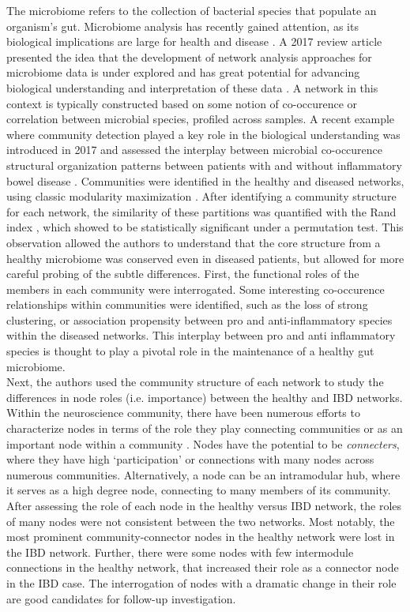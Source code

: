 \indent The microbiome refers to the collection of bacterial species that populate an organism's gut. Microbiome analysis has recently gained attention, as its biological implications are large for health and disease \cite{gut}. A 2017 review article presented the idea that the development of network analysis approaches for microbiome data is under explored and has great potential for advancing biological understanding and interpretation of these data \cite{networkMicrobiome}. A network in this context is typically constructed based on some notion of co-occurence or correlation between microbial species, profiled across samples. A recent example where community detection played a key role in the biological understanding was introduced in 2017 and assessed the interplay between microbial co-occurence structural organization patterns between patients with and without inflammatory bowel disease \cite{moduleMicrobiome}. Communities were identified in the healthy and diseased networks, using classic modularity maximization \cite{girvancommunity}. After identifying a community structure for each network, the similarity of these partitions was quantified with the Rand index \cite{Rand}, which showed to be statistically significant under a permutation test. This observation allowed the authors to understand that the core structure from a healthy microbiome was conserved even in diseased patients, but allowed for more careful probing of the subtle differences. First, the functional roles of the members in each community were interrogated. Some interesting co-occurence relationships within communities were identified, such as the loss of strong clustering, or association propensity between pro and anti-inflammatory species within the diseased networks. This interplay between pro and anti inflammatory species is thought to play a pivotal role in the maintenance of a healthy gut microbiome. \\
\indent Next, the authors used the community structure of each network to study the differences in node roles (i.e. importance) between the healthy and IBD networks. Within the neuroscience community, there have been numerous efforts to characterize nodes in terms of the role they play connecting communities or as an important node within a community \cite{hub}. Nodes have the potential to be \emph{connecters}, where they have high `participation' or connections with many nodes across numerous communities. Alternatively, a node can be an intramodular hub, where it serves as a high degree node, connecting to many members of its community. After assessing the role of each node in the healthy versus IBD network, the roles of many nodes were not consistent between the two networks. Most notably, the most prominent community-connector nodes in the healthy network were lost in the IBD network. Further, there were some nodes with few intermodule connections in the healthy network, that increased their role as a connector node in the IBD case. The interrogation of nodes with a dramatic change in their role are good candidates for follow-up investigation. \\
